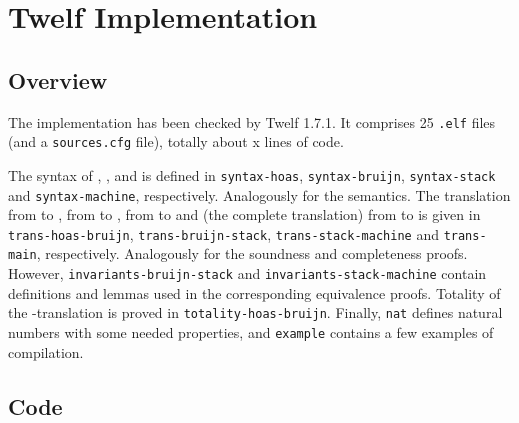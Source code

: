 \appendix

\section{Twelf Implementation}
\label{sec:code}

\subsection{Overview}

The implementation has been checked by Twelf 1.7.1.
It comprises 25 \texttt{.elf} files (and a \texttt{sources.cfg} file), totally about x lines of code.

The syntax of \hlang, \blang, \slang and \mlang is defined in \texttt{syntax-hoas}, \texttt{syntax-bruijn}, \texttt{syntax-stack} and \texttt{syntax-machine}, respectively.
Analogously for the semantics.
The translation from \hlang to \blang, from \blang to \slang, from \slang to \mlang and (the complete translation) from \hlang to \mlang is given in \texttt{trans-hoas-bruijn}, \texttt{trans-bruijn-stack}, \texttt{trans-stack-machine} and \texttt{trans-main}, respectively.
Analogously for the soundness and completeness proofs.
However, \texttt{invariants-bruijn-stack} and \texttt{invariants-stack-machine} contain definitions and lemmas used in the corresponding equivalence proofs.
Totality of the \hlang-\blang translation is proved in \texttt{totality-hoas-bruijn}.
Finally, \texttt{nat} defines natural numbers with some needed properties, and \texttt{example} contains a few examples of compilation.

\subsection{Code}
\begingroup
\makeatletter
\@totalleftmargin=-2.5cm

\endgroup
